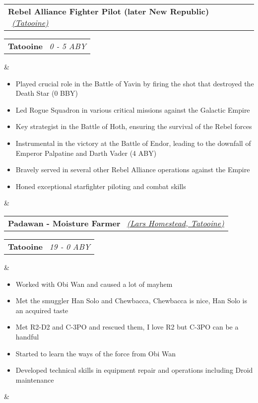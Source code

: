 \documentclass[11pt,a4paper]{moderncv}
\makeatletter
\newcommand*{\customcventry}[7][.53em]{
	\vspace*{2mm}	
	\begin{tabular}{@{}l}
		{\bfseries #4} \
		{\itshape #3}
	\end{tabular}
	\hfill
	\begin{tabular}{l@{}}
		{\bfseries #5} \
		{\itshape #2}
	\end{tabular}
	\ifx&#7&%
	\else{\
		\begin{minipage}{\maincolumnwidth}%
			\small#7%
	\end{minipage}}\fi%
	\par\addvspace{#1}}
\makeatother
\begin{document}
\begin{flushleft}
		\customcventry{0 ‐ 5 ABY}
		{{\color{blue}\href{https://starwars.fandom.com/wiki/Luke_Skywalker}{(Tatooine)}}}{Rebel Alliance Fighter Pilot  (later New Republic)
		}{Tatooine}{}{
			\vspace*{2mm}
			{\begin{itemize}[leftmargin=0.8cm, , rightmargin=0.3cm, label={\textbullet}]
					\item Played crucial role in the Battle of Yavin by firing the shot that destroyed the Death Star (0 BBY)
					\item Led Rogue Squadron in various critical missions against the Galactic Empire
					\item Key strategist in the Battle of Hoth, ensuring the survival of the Rebel forces
					\item Instrumental in the victory at the Battle of Endor, leading to the downfall of Emperor Palpatine and Darth Vader (4 ABY)
					\item Bravely served in several other Rebel Alliance operations against the Empire
					\item Honed exceptional starfighter piloting and combat skills
		\end{itemize}}}
		
		
		
		\customcventry{19 ‐ 0 ABY} {{\color{blue}\href{https://starwars.fandom.com/wiki/Luke_Skywalker}{(Lars Homestead, Tatooine)}}}{Padawan - Moisture Farmer}{Tatooine}{}{
			\vspace*{2mm}
			{\begin{itemize}[leftmargin=0.8cm, , rightmargin=0.3cm, label={\textbullet}]
					\item Worked with Obi Wan and caused a lot of mayhem
					\item Met the smuggler Han Solo and Chewbacca, Chewbacca is nice, Han Solo is an acquired taste
					\item Met R2-D2 and C-3PO and rescued them, I love R2 but C-3PO can be a handful
					\item Started to learn the ways of the force from Obi Wan 
					\item Developed technical skills in equipment repair and operations including Droid maintenance
		\end{itemize}}}	
		
		

\end{flushleft}
\end{document}
